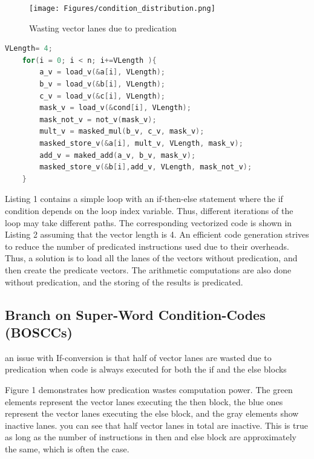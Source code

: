 \begin{figure}[h]
  \centering
  \texttt{[image: Figures/condition\_distribution.png]}
  \caption{Wasting vector lanes due to predication}
\end{figure}

\begin{lstlisting}[language=C, caption={If-Converted Code}]
    VLength= 4;
    for(i = 0; i < n; i+=VLength ){
        a_v = load_v(&a[i], VLength);
        b_v = load_v(&b[i], VLength);
        c_v = load_v(&c[i], VLength);
        mask_v = load_v(&cond[i], VLength);
        mask_not_v = not_v(mask_v);
        mult_v = masked_mul(b_v, c_v, mask_v);
        masked_store_v(&a[i], mult_v, VLength, mask_v);
        add_v = maked_add(a_v, b_v, mask_v);
        masked_store_v(&b[i],add_v, VLength, mask_not_v);
    }
\end{lstlisting}


Listing 1 contains a simple loop with an if-then-else statement where the if condition depends on the loop index variable. 
Thus, different iterations of the loop may take different paths. 
The corresponding vectorized code is shown in Listing 2 assuming that the vector length is 4. 
An efficient code generation strives to reduce the number of predicated instructions used due to their overheads.
Thus, a solution is to load all the lanes of the vectors without predication, and then create the predicate vectors.  
The arithmetic computations are also done without predication, and the storing of the results is predicated. 


\subsection{Branch on Super-Word Condition-Codes (BOSCCs)}
an issue with If-conversion is that half of vector lanes are wasted due to predication when code is always executed for both the if and the else blocks

Figure 1 demonstrates how predication wastes computation power. The green elements represent the vector lanes executing the then block, the blue ones represent the vector lanes executing the else block, and the gray elements show inactive lanes. you can see that half vector lanes in total are inactive. This is true as long as the number of instructions in then and else block are approximately the same, which is often the case.

